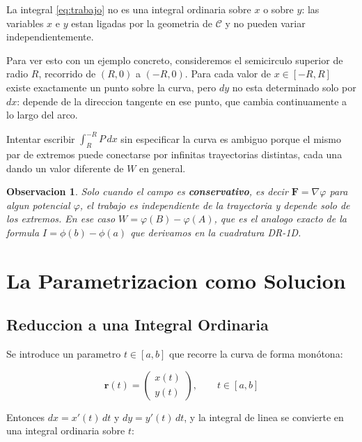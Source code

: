 \documentclass[12pt,a4paper]{article}
\newtheorem{remark}{Observacion}
\begin{document}
La integral \eqref{eq:trabajo} no es una integral ordinaria sobre $x$ o
sobre $y$: las variables $x$ e $y$ estan ligadas por la geometria de
$\mathcal{C}$ y no pueden variar independientemente.

Para ver esto con un ejemplo concreto, consideremos el semicirculo superior
de radio $R$, recorrido de $(R,0)$ a $(-R,0)$. Para cada valor de
$x \in [-R, R]$ existe exactamente un punto sobre la curva, pero $dy$ no
esta determinado solo por $dx$: depende de la direccion tangente en ese
punto, que cambia continuamente a lo largo del arco.

Intentar escribir $\int_{R}^{-R} P\,dx$ sin especificar la curva es
ambiguo porque el mismo par de extremos puede conectarse por infinitas
trayectorias distintas, cada una dando un valor diferente de $W$ en
general.

\begin{remark}
Solo cuando el campo es \textbf{conservativo}, es decir
$\mathbf{F} = \nabla\varphi$ para algun potencial $\varphi$, el trabajo
es independiente de la trayectoria y depende solo de los extremos. En
ese caso $W = \varphi(B) - \varphi(A)$, que es el analogo exacto de la
formula $I = \phi(b) - \phi(a)$ que derivamos en la cuadratura DR-1D.
\end{remark}

\section{La Parametrizacion como Solucion}

\subsection{Reduccion a una Integral Ordinaria}

Se introduce un parametro $t \in [a,b]$ que recorre la curva de forma
monótona:

\begin{equation}
    \mathbf{r}(t) = \begin{pmatrix} x(t) \\ y(t) \end{pmatrix},
    \qquad t \in [a,b]
    \label{eq:param}
\end{equation}

Entonces $dx = x'(t)\,dt$ y $dy = y'(t)\,dt$, y la integral de linea se
convierte en una integral ordinaria sobre $t$:
\end{document}
